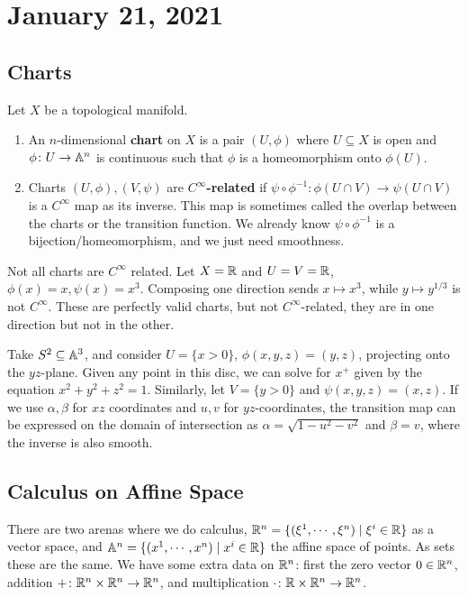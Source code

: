 \section{January 21, 2021}
\subsection{Charts}
\begin{definition}[]
    Let $X$ be a topological manifold. 
    \begin{enumerate}[label=(\roman*)]
        \item An $n$-dimensional \textbf{chart} on $X$ is a pair $(U, \phi)$ where $U \subseteq X$ is open and $\phi \colon U \to \mathbb{A}^n $ is continuous such that $\phi$ is a homeomorphism onto $\phi(U)$.
        \item Charts $(U, \phi), (V, \psi)$ are $C^{\infty}$\textbf{-related} if $\psi \circ  \phi ^{-1} \colon  \phi (U \cap V) \to \psi (U \cap V)$ is a $C^{\infty}$ map as its inverse. This map is sometimes called the overlap between the charts or the transition function. We already know $\psi \circ \phi ^{-1}$ is a bijection/homeomorphism, and we just need smoothness.
    \end{enumerate}
\end{definition}
\begin{example}
    Not all charts are $C^{\infty}$ related. Let $X=\mathbb{R}$ and $U=V=\mathbb{R}$, $\phi(x)=x, \psi (x)=x^3$. Composing one direction sends $x \mapsto  x^3$, while $y \mapsto  y^{1 /3}$ is not $C^{\infty}$. These are perfectly valid charts, but not $C^{\infty}$-related, they are in one direction but not in the other.
\end{example}
\begin{example}
    Take $S^2 \subseteq \mathbb{A}^3$, and consider $U= \{x>0\} $, $\phi (x,y, z)=(y,z)$, projecting onto the $yz$-plane. Given any point in this disc, we can solve for $x^+$ given by the equation $x^2+y^2+z^2=1$. Similarly, let $V=\{y>0\} $ and $\psi(x,y,z)=(x,z)$. If we use $\alpha ,\beta $ for $xz$ coordinates and $u,v$ for $yz$-coordinates, the transition map can be expressed on the domain of intersection as $\alpha =\sqrt{1-u^2-v^2} $ and $\beta =v$, where the inverse is also smooth.
\end{example}
\subsection{Calculus on Affine Space}
There are two arenas where we do calculus, $\mathbb{R}^n = \{(\xi^1,\cdots ,\xi^n )  \mid  \xi^i  \in \mathbb{R}\}  $ as a vector space, and $\mathbb{A}^n= \{(x^1,\cdots ,x^n )  \mid x^i  \in \mathbb{R}\}  $ the affine space of points. As sets these are the same. We have some extra data on $\mathbb{R}^n $: first the zero vector $0 \in \mathbb{R}^n $, addition $+ \colon \mathbb{R}^n \times \mathbb{R}^n  \to \mathbb{R}^n $, and multiplication $\cdot  \colon \mathbb{R}\times \mathbb{R}^n  \to \mathbb{R}^n $. 

